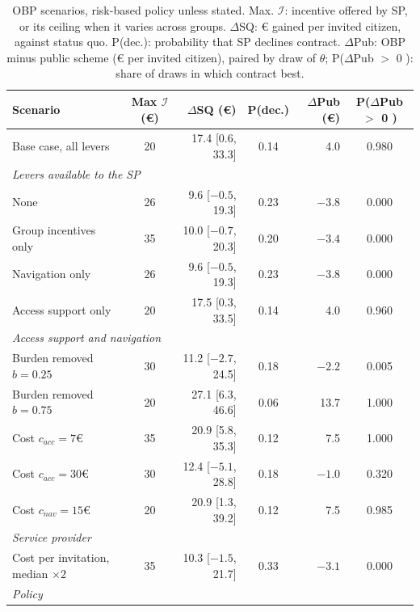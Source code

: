 \documentclass[12pt]{article}
\begin{document}
\begin{table}[h!]
\centering
\footnotesize
\caption{OBP scenarios, risk-based policy unless stated. Max. $\mathcal{I}$: incentive offered by SP, or its ceiling when it varies across groups. $\Delta$SQ: € gained per invited citizen, against status quo. P(dec.): probability that SP declines contract. $\Delta$Pub: OBP minus public scheme (€ per invited citizen), paired by draw of $\theta$; P($\Delta$Pub $>$ 0 ): share of draws in which contract best.}
\label{tab:obp_sensitivity}
\begin{tabular}{l c r c r c}
\toprule
\textbf{Scenario} & \textbf{Max $\mathcal{I}$ (€)} & \textbf{$\Delta$SQ (€)} & \textbf{P(dec.)} & \textbf{$\Delta$Pub (€)} & \textbf{P($\Delta$Pub $>$ 0 )}  \\
\midrule
Base case, all levers                  & 20 & 17.4 [0.6, 33.3]    & 0.14 & 4.0    & 0.980 \\
\midrule
\multicolumn{6}{l}{\emph{Levers available to the SP}} \\
None                                   & 26 &  9.6 [$-0.5$, 19.3] & 0.23 & $-3.8$ & 0.000 \\
Group incentives only                  & 35 & 10.0 [$-0.7$, 20.3] & 0.20 & $-3.4$ & 0.000 \\
Navigation only                        & 26 &  9.6 [$-0.5$, 19.3] & 0.23 & $-3.8$ & 0.000 \\
Access support only                    & 20 & 17.5 [0.3, 33.5]    & 0.14 & 4.0    & 0.960 \\
\midrule
\multicolumn{6}{l}{\emph{Access support and navigation}} \\
Burden removed $b = 0.25$              & 30 & 11.2 [$-2.7$, 24.5] & 0.18 & $-2.2$ & 0.005 \\
Burden removed $b = 0.75$              & 20 & 27.1 [6.3, 46.6]    & 0.06 & 13.7   & 1.000 \\
Cost $c_{acc} = 7$€                    & 35 & 20.9 [5.8, 35.3]    & 0.12 & 7.5    & 1.000 \\
Cost $c_{acc} = 30$€                   & 30 & 12.4 [$-5.1$, 28.8] & 0.18 & $-1.0$ & 0.320 \\
Cost $c_{nav} = 15$€                   & 20 & 20.9 [1.3, 39.2]    & 0.12 & 7.5    & 0.985 \\
\midrule
\multicolumn{6}{l}{\emph{Service provider}} \\
Cost per invitation, median $\times 2$ & 35 & 10.3 [$-1.5$, 21.7] & 0.33 & $-3.1$ & 0.000 \\
\midrule
\multicolumn{6}{l}{\emph{Policy}} \\

\end{tabular}
\end{table}
\end{document}

